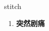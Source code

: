 
\begin{frame}
{\huge stitch}
\begin{center}
\begin{enumerate}\Large
  \item \textbf{突然剧痛}
\end{enumerate}
\end{center}
\end{frame}
